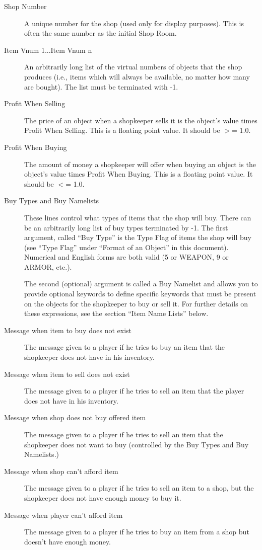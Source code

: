 \documentclass[11pt]{article}
\begin{document}
\begin{description}
\item[Shop Number] A unique number for the shop (used only for display purposes).  This is often the same number as the initial Shop Room.
\item[Item Vnum 1...Item Vnum n] An arbitrarily long list of the virtual numbers of objects that the shop produces (i.e., items which will always be available, no matter how many are bought).  The list must be terminated with -1.
\item[Profit When Selling] The price of an object when a shopkeeper sells it is the object's value times Profit When Selling.  This is a floating point value. It should be $>$= 1.0.
\item[Profit When Buying] The amount of money a shopkeeper will offer when buying an object is the object's value times Profit When Buying.  This is a floating point value. It should be $<$= 1.0.
\item[Buy Types and Buy Namelists] These lines control what types of items that the shop will buy.  There can be an arbitrarily long list of buy types terminated by -1. The first argument, called ``Buy Type'' is the Type Flag of items the shop will buy (see ``Type Flag'' under ``Format of an Object'' in this document). Numerical and English forms are both valid (5 or WEAPON, 9 or ARMOR, etc.).
\par
The second (optional) argument is called a Buy Namelist and allows you to provide optional keywords to define specific keywords that must be present on the objects for the shopkeeper to buy or sell it.  For further details on these expressions, see the section ``Item Name Lists'' below.
\item[Message when item to buy does not exist] The message given to a player if he tries to buy an item that the shopkeeper does not have in his inventory.
\item[Message when item to sell does not exist] The message given to a player if he tries to sell an item that the player does not have in his inventory.
\item[Message when shop does not buy offered item] The message given to a player if he tries to sell an item that the shopkeeper does not want to buy (controlled by the Buy Types and Buy Namelists.)
\item[Message when shop can't afford item] The message given to a player if he tries to sell an item to a shop, but the shopkeeper does not have enough money to buy it.
\item[Message when player can't afford item] The message given to a player if he tries to buy an item from a shop but doesn't have enough money.

\end{description}
\end{document}
